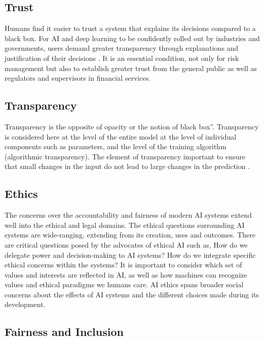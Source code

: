 \subsection{Trust}

Humans find it easier to trust a system that explains its decisions compared to a black box. For AI and deep learning to be confidently rolled out by industries and governments, users demand greater transparency through explanations and justification of their decisions \cite{molnar}. It is an essential condition, not only for risk management but also to establish greater trust from the general public as well as regulators and supervisors in financial services.


\subsection{Transparency}

Transparency is the opposite of opacity or the notion of black box”. Transparency is considered here at the level of the entire model at the level of individual components such as parameters, and the level of the training algorithm (algorithmic transparency). The element of transparency important to ensure that small changes in the input do not lead to large changes in the prediction \cite{molnar}.

\subsection{Ethics}

The concerns over the accountability and fairness of modern AI systems extend well into the ethical and legal domains. The ethical questions surrounding AI systems are wide-ranging, extending from its creation, uses and outcomes. There are critical questions posed by the advocates of ethical AI such as, How do we delegate power and decision-making to AI systems? \cite{ainow2016report} How do we integrate specific ethical concerns within the systems? It is important to consider which set of values and interests are reflected in AI, as well as how machines can recognize values and ethical paradigms we humans care. AI ethics spans broader social concerns about the effects of AI systems and the different choices made during its development.

\subsection{Fairness and Inclusion}

